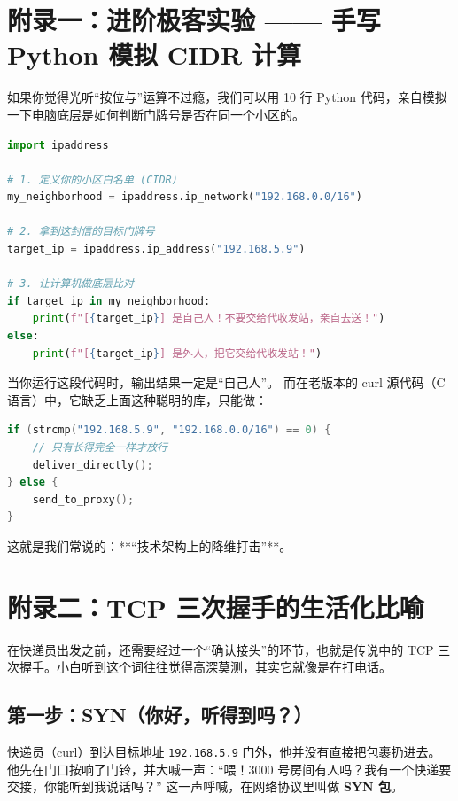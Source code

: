\documentclass[12pt,a4paper]{ctexart}
\begin{document}
\newpage
\section{附录一：进阶极客实验 —— 手写 Python 模拟 CIDR 计算}

如果你觉得光听“按位与”运算不过瘾，我们可以用 10 行 Python 代码，亲自模拟一下电脑底层是如何判断门牌号是否在同一个小区的。

\begin{lstlisting}[language=Python, title=cidr\_check.py]
import ipaddress

# 1. 定义你的小区白名单 (CIDR)
my_neighborhood = ipaddress.ip_network("192.168.0.0/16")

# 2. 拿到这封信的目标门牌号
target_ip = ipaddress.ip_address("192.168.5.9")

# 3. 让计算机做底层比对
if target_ip in my_neighborhood:
    print(f"[{target_ip}] 是自己人！不要交给代收发站，亲自去送！")
else:
    print(f"[{target_ip}] 是外人，把它交给代收发站！")
\end{lstlisting}

当你运行这段代码时，输出结果一定是“自己人”。
而在老版本的 curl 源代码（C语言）中，它缺乏上面这种聪明的库，只能做：
\begin{lstlisting}[language=C, title=笨笨的C语言逻辑]
if (strcmp("192.168.5.9", "192.168.0.0/16") == 0) {
    // 只有长得完全一样才放行
    deliver_directly();
} else {
    send_to_proxy();
}
\end{lstlisting}

这就是我们常说的：**“技术架构上的降维打击”**。

\newpage
\section{附录二：TCP 三次握手的生活化比喻}

在快递员出发之前，还需要经过一个“确认接头”的环节，也就是传说中的 TCP 三次握手。小白听到这个词往往觉得高深莫测，其实它就像是在打电话。

\subsection{第一步：SYN（你好，听得到吗？）}
快递员（curl）到达目标地址 \texttt{192.168.5.9} 门外，他并没有直接把包裹扔进去。
他先在门口按响了门铃，并大喊一声：“喂！3000 号房间有人吗？我有一个快递要交接，你能听到我说话吗？”
这一声呼喊，在网络协议里叫做 \textbf{SYN 包}。
\end{document}
